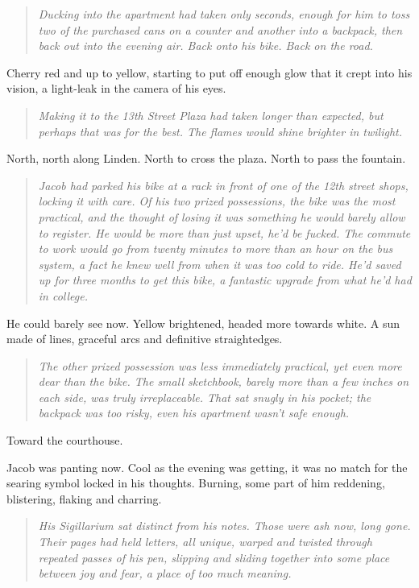 \begin{quote}
\emph{Ducking into the apartment had taken only seconds, enough for him to toss two of the purchased cans on a counter and another into a backpack, then back out into the evening air. Back onto his bike. Back on the road.}
\end{quote}

Cherry red and up to yellow, starting to put off enough glow that it crept into his vision, a light-leak in the camera of his eyes.

\begin{quote}
\emph{Making it to the 13th Street Plaza had taken longer than expected, but perhaps that was for the best. The flames would shine brighter in twilight.}
\end{quote}

North, north along Linden. North to cross the plaza. North to pass the fountain.

\begin{quote}
\emph{Jacob had parked his bike at a rack in front of one of the 12th street shops, locking it with care. Of his two prized possessions, the bike was the most practical, and the thought of losing it was something he would barely allow to register. He would be more than just upset, he'd be fucked. The commute to work would go from twenty minutes to more than an hour on the bus system, a fact he knew well from when it was too cold to ride. He'd saved up for three months to get this bike, a fantastic upgrade from what he'd had in college.}
\end{quote}

He could barely see now. Yellow brightened, headed more towards white. A sun made of lines, graceful arcs and definitive straightedges.

\begin{quote}
\emph{The other prized possession was less immediately practical, yet even more dear than the bike. The small sketchbook, barely more than a few inches on each side, was truly irreplaceable. That sat snugly in his pocket; the backpack was too risky, even his apartment wasn't safe enough.}
\end{quote}

Toward the courthouse.

Jacob was panting now. Cool as the evening was getting, it was no match for the searing symbol locked in his thoughts. Burning, some part of him reddening, blistering, flaking and charring.

\begin{quote}
\emph{His Sigillarium sat distinct from his notes. Those were ash now, long gone. Their pages had held letters, all unique, warped and twisted through repeated passes of his pen, slipping and sliding together into some place between joy and fear, a place of too much meaning.}
\end{quote}

